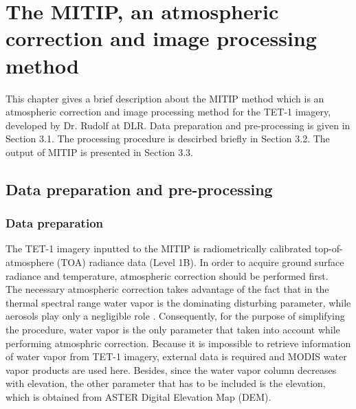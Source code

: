 \chapter{The MITIP, an atmospheric correction and image processing method}

\label{Chapter3}

This chapter gives a brief description about the MITIP method which is an atmospheric correction and image processing method for the TET-1 imagery, developed by Dr. Rudolf at DLR. Data preparation and pre-processing is given in Section 3.1. The processing procedure is descirbed briefly in Section 3.2. The output of MITIP is presented in Section 3.3.\\


\section{Data preparation and pre-processing}


\subsection{Data preparation}
The TET-1 imagery inputted to the MITIP is radiometrically calibrated top-of-atmosphere (TOA) radiance data (Level 1B). In order to acquire ground surface radiance and temperature, atmospheric correction should be performed first.\\

\noindent The necessary atmospheric correction takes advantage of the fact that in the thermal spectral range water vapor is the dominating disturbing parameter, while aerosols play only a negligible role \parencite{Reference204}. Consequently, for the purpose of simplifying the procedure, water vapor is the only parameter that taken into account while performing atmosphric correction. Because it is impossible to retrieve information of water vapor from TET-1 imagery, external data is required and MODIS water vapor products are used here. Besides, since the water vapor column decreases with elevation, the other parameter that has to be included is the elevation, which is obtained from ASTER Digital Elevation Map (DEM).\\

